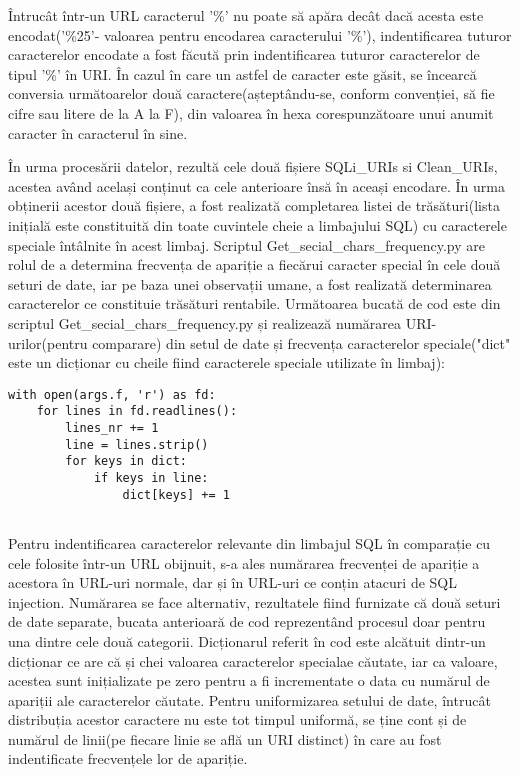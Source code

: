 Întrucât într-un URL caracterul '\%' nu poate să apăra decât dacă acesta este encodat('\%25'- valoarea pentru encodarea caracterului '\%'), indentificarea tuturor caracterelor encodate a fost făcută prin indentificarea tuturor caracterelor de tipul '\%' în URI. În cazul în care un astfel de caracter este găsit, se încearcă conversia următoarelor două caractere(așteptându-se, conform convenției, să fie cifre sau litere de la A la F), din valoarea în hexa corespunzătoare unui anumit caracter în caracterul în sine. 

  
În urma procesării datelor, rezultă cele două fișiere  SQLi\_URIs si Clean\_URIs,  acestea având același conținut ca cele anterioare însă în aceași encodare. În urma obținerii acestor două fișiere, a fost realizată completarea listei de trăsături(lista inițială este constituită din toate cuvintele cheie a limbajului SQL) cu caracterele speciale întâlnite în acest limbaj. Scriptul  Get\_secial\_chars\_frequency.py  are rolul de a determina frecvența de apariție a fiecărui caracter special în cele două seturi de date, iar pe baza unei observații umane, a fost realizată determinarea caracterelor ce constituie trăsături rentabile. Următoarea bucată de cod este din scriptul Get\_secial\_chars\_frequency.py  și realizează numărarea URI-urilor(pentru comparare) din setul de date și frecvența caracterelor speciale("dict" este un dicționar cu cheile fiind caracterele speciale utilizate în limbaj): 
\lstset{language=python,frame=single, showstringspaces=false}
\begin{lstlisting}
with open(args.f, 'r') as fd:
    for lines in fd.readlines():
        lines_nr += 1
        line = lines.strip()
        for keys in dict:
            if keys in line:
                dict[keys] += 1
                
\end{lstlisting}

Pentru indentificarea caracterelor relevante din limbajul SQL în comparație cu cele folosite într-un URL obijnuit, s-a ales numărarea frecvenței de apariție a acestora în URL-uri normale, dar și în URL-uri ce conțin atacuri de SQL injection. Numărarea se face alternativ, rezultatele fiind furnizate că două seturi de date separate, bucata anterioară de cod reprezentând procesul doar pentru una dintre cele două categorii. Dicționarul referit în cod este alcătuit dintr-un dicționar ce are că și chei valoarea caracterelor specialae căutate, iar ca valoare, acestea sunt inițializate pe zero pentru a fi incrementate o data cu numărul de apariții ale caracterelor căutate. Pentru uniformizarea setului de date, întrucât distribuția acestor caractere nu este tot timpul uniformă, se ține cont și de numărul de linii(pe fiecare linie se află un URI distinct) în care au fost indentificate frecvențele lor de apariție. 


